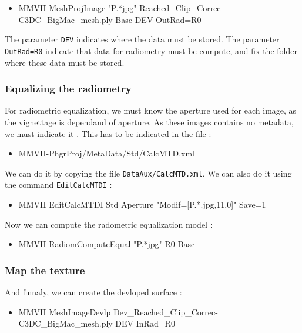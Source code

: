 \begin{itemize}
    \item {MMVII MeshProjImage "P.*jpg"  Reached\_Clip\_Correc-C3DC\_BigMac\_mesh.ply Basc DEV OutRad=R0}
\end{itemize}

The parameter {\tt DEV} indicates where the data must be stored.
The parameter {\tt OutRad=R0} indicate that data for radiometry 
must be compute, and fix the folder where these data must be stored.


\subsubsection{Equalizing the radiometry}

For radiometric equalization, we must know the aperture used for each image,
as the vignettage is dependand of aperture. As these images contains no metadata,
we must indicate it . This has to be indicated in the file :

\begin{itemize}
    \item {MMVII-PhgrProj/MetaData/Std/CalcMTD.xml}
\end{itemize}

We can do it by copying the file {\tt DataAux/CalcMTD.xml}. We can also
do it using the command {\tt EditCalcMTDI} :

\begin{itemize}
      \item {MMVII  EditCalcMTDI Std Aperture "Modif=[P.*.jpg,11,0]"  Save=1}
\end{itemize}

Now we can compute the radometric equalization model :

\begin{itemize}
     \item {MMVII RadiomComputeEqual "P.*jpg" R0 Basc}
\end{itemize}



\subsubsection{Map the texture}

And finnaly, we can create the devloped surface :


\begin{itemize}
	\item {MMVII MeshImageDevlp Dev\_Reached\_Clip\_Correc-C3DC\_BigMac\_mesh.ply  DEV InRad=R0}
\end{itemize}






